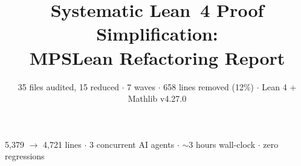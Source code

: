 \documentclass[aspectratio=169,10pt]{beamer}
\title{\textbf{Systematic Lean~4 Proof Simplification:\\MPSLean Refactoring Report}}
\subtitle{{\small 35 files audited, 15 reduced $\cdot$ 7 waves $\cdot$ 658 lines removed (12\%) $\cdot$ Lean 4 + Mathlib v4.27.0}}
\date{}
\author{}
\begin{document}
{%
\begin{frame}
    \vspace{-1.5em}
    \maketitle
    \vspace{-3em}
    \begin{center}
        {\footnotesize
            \textcolor{dimwhite}{5{,}379 $\to$ 4{,}721 lines $\cdot$
            3 concurrent AI agents $\cdot$
            ${\sim}$3 hours wall-clock $\cdot$
            zero regressions}}
    \end{center}
\end{frame}
}

\end{document}
